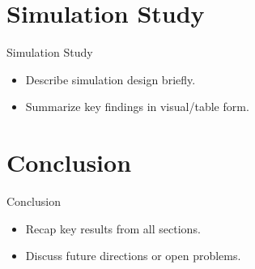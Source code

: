 \documentclass{beamer}
\newcommand{\0}{\emptyset}
\newcommand{\1}{\mathmybb{1}}
\begin{document}
\section{Simulation Study}
\begin{frame}{Simulation Study}
  \begin{itemize}
    \item Describe simulation design briefly.
    \item Summarize key findings in visual/table form.
  \end{itemize}
\end{frame}

\section{Conclusion}
\begin{frame}{Conclusion}
  \begin{itemize}
    \item Recap key results from all sections.
    \item Discuss future directions or open problems.
  \end{itemize}
\end{frame}
\end{document}
